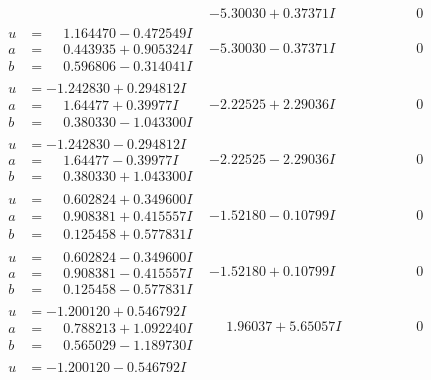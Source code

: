\documentclass[1p]{elsarticle_modified}
\theoremstyle{definition}
\begin{document}
$$\begin{array}{c|c|c}
 & -5.30030 + 0.37371 I & \phantom{-0.000000 } 0 \\ \hline\begin{aligned}
u &= \phantom{-}1.164470 - 0.472549 I \\
a &= \phantom{-}0.443935 + 0.905324 I \\
b &= \phantom{-}0.596806 - 0.314041 I\end{aligned}
 & -5.30030 - 0.37371 I & \phantom{-0.000000 } 0 \\ \hline\begin{aligned}
u &= -1.242830 + 0.294812 I \\
a &= \phantom{-}1.64477 + 0.39977 I \\
b &= \phantom{-}0.380330 - 1.043300 I\end{aligned}
 & -2.22525 + 2.29036 I & \phantom{-0.000000 } 0 \\ \hline\begin{aligned}
u &= -1.242830 - 0.294812 I \\
a &= \phantom{-}1.64477 - 0.39977 I \\
b &= \phantom{-}0.380330 + 1.043300 I\end{aligned}
 & -2.22525 - 2.29036 I & \phantom{-0.000000 } 0 \\ \hline\begin{aligned}
u &= \phantom{-}0.602824 + 0.349600 I \\
a &= \phantom{-}0.908381 + 0.415557 I \\
b &= \phantom{-}0.125458 + 0.577831 I\end{aligned}
 & -1.52180 - 0.10799 I & \phantom{-0.000000 } 0 \\ \hline\begin{aligned}
u &= \phantom{-}0.602824 - 0.349600 I \\
a &= \phantom{-}0.908381 - 0.415557 I \\
b &= \phantom{-}0.125458 - 0.577831 I\end{aligned}
 & -1.52180 + 0.10799 I & \phantom{-0.000000 } 0 \\ \hline\begin{aligned}
u &= -1.200120 + 0.546792 I \\
a &= \phantom{-}0.788213 + 1.092240 I \\
b &= \phantom{-}0.565029 - 1.189730 I\end{aligned}
 & \phantom{-}1.96037 + 5.65057 I & \phantom{-0.000000 } 0 \\ \hline\begin{aligned}
u &= -1.200120 - 0.546792 I \\

\end{aligned}
\end{array}$$
\end{document}
